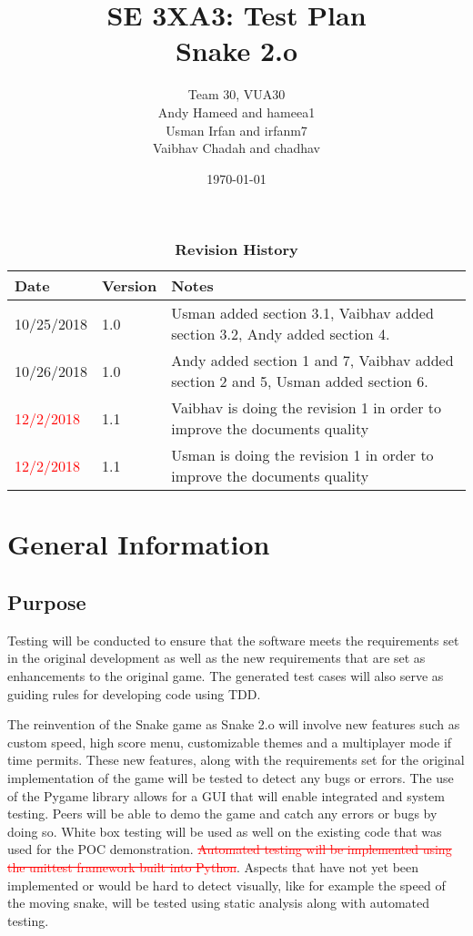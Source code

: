 \documentclass[12pt, titlepage]{article}
\title{SE 3XA3: Test Plan\\Snake 2.o}
\author{Team 30, VUA30
	\\ Andy Hameed and hameea1
	\\ Usman Irfan and irfanm7
	\\ Vaibhav Chadah and chadhav
}
\date{\today}
\begin{document}
\maketitle

\tableofcontents
\listoftables
\listoffigures

\begin{table}[bp]
\caption{\bf Revision History}
\begin{tabularx}{\textwidth}{p{3cm}p{2cm}X}
\toprule {\bf Date} & {\bf Version} & {\bf Notes}\\
\midrule
10/25/2018 & 1.0 & Usman added section 3.1, Vaibhav added section 3.2, Andy added section 4. \\
10/26/2018 & 1.0 & Andy added section 1 and 7, Vaibhav added section 2 and 5, Usman added section 6.\\
\textcolor{red}{12/2/2018} & 1.1 & Vaibhav is doing the revision 1 in order to improve the documents quality\\
\textcolor{red}{12/2/2018} & 1.1 & Usman is doing the revision 1 in order to improve the documents quality\\
\bottomrule
\end{tabularx}
\end{table}

\newpage


\section{General Information}

\subsection{Purpose}
Testing will be conducted to ensure that the software meets the requirements set in the original development as well as the new requirements that are set as enhancements to the original game. The generated test cases will also serve as guiding rules for developing code using TDD.

The reinvention of the Snake game as Snake 2.o will involve new features such as custom speed, high score menu, customizable themes and a multiplayer mode if time permits. These new features, along with the requirements set for the original implementation of the game will be tested to detect any bugs or errors. The use of the Pygame library allows for a GUI that will enable integrated and system testing. Peers will be able to demo the game and catch any errors or bugs by doing so. White box testing will be used as well on the existing code that was used for the POC demonstration. \textcolor{red}{ \st{Automated testing will be implemented using the unittest framework built into Python}}. Aspects  that have not yet been implemented or would be hard to detect visually, like for example the speed of the moving snake, will be tested using static analysis along with automated testing.
\end{document}

